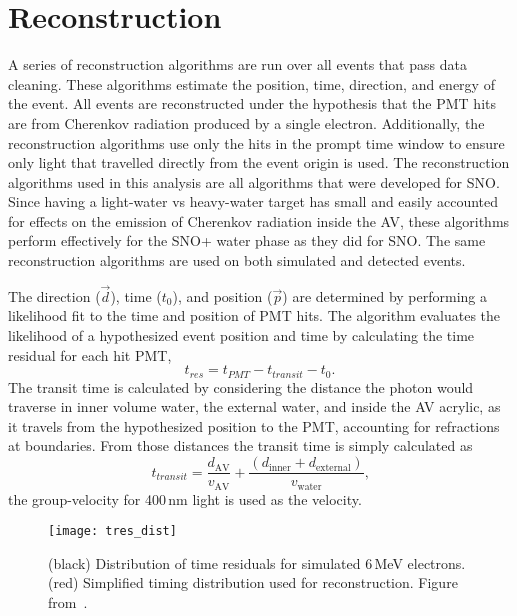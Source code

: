 \section{Reconstruction}
\label{sec:reconstruction}
A series of reconstruction algorithms are run over all events that pass data cleaning.
These algorithms estimate the position, time, direction, and energy of the event.
All events are reconstructed under the hypothesis that the PMT hits are from Cherenkov radiation
produced by a single electron.
Additionally, the reconstruction algorithms use only the hits in the prompt time window to ensure only light
that travelled directly from the event origin is used.
The reconstruction algorithms used in this analysis are all algorithms
that were developed for SNO\@.
Since having a light-water vs heavy-water target has small and easily accounted for
effects on the emission of Cherenkov radiation inside the AV, these algorithms
perform effectively for the SNO+ water phase as they did for SNO\@.
The same reconstruction algorithms are used on both simulated and detected events.

The direction ($\vec{d}$), time ($t_{0}$), and position ($\vec{p}$) are determined by performing a likelihood
fit to the time and position of PMT hits.
The algorithm evaluates the likelihood of a hypothesized event position and time by
calculating the time residual for each hit PMT,
\begin{equation}
\label{eqn:tres}
t_{res} = t_{PMT} - t_{transit} - t_{0}\text{.}
\end{equation}
The transit time is calculated by considering the distance the photon would
traverse in inner volume water, the external water, and inside the AV acrylic, as
it travels from the hypothesized position to the PMT, accounting for refractions
at boundaries.
From those distances the transit time is simply calculated as
\begin{equation}
t_{transit} = \frac{d_{\mathrm{AV}}}{v_{\mathrm{AV}}} + \frac{(d_{\mathrm{inner}} + d_{\mathrm{external}})}{v_{\mathrm{water}}}\text{,}
\end{equation}
the group-velocity for 400\,nm light is used as the velocity.

\begin{figure}[htbp]
\centering
\texttt{[image: tres\_dist]}
\caption[Simulated Distribution of $t_{\mathrm{res}}$]{
(black) Distribution of time residuals for simulated 6\,MeV electrons. (red) Simplified
timing distribution used for reconstruction. Figure from~\citep{richie_thesis}.}
\label{fig:tres_dist}
\end{figure}

